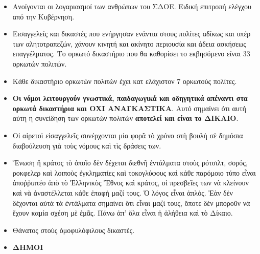 \documentclass[a4paper]{article}
\begin{document}
\begin{itemize}
\item Ανοίγονται οι λογαριασμοί των ανθρώπων του ΣΔΟΕ. Ειδική επιτροπή ελέγχου από την Κυβέρνηση.
\item Εισαγγελείς και δικαστές που ενήργησαν ενάντια στους πολίτες αδίκως και υπέρ των αλητοτραπεζών, χάνουν κινητή και ακίνητο περιουσία και άδεια ασκήσεως επαγγέλματος. Το ορκωτό δικαστήριο που θα καθορίσει το εκβησόμενο είναι 33 ορκωτών πολιτών.
\item Κάθε δικαστήριο ορκωτών πολιτών έχει κατ ελάχιστον 7 ορκωτούς πολίτες.
\item \textbf{Οι νόμοι λειτουργούν γνωστικά, παιδαγωγικά και οδηγητικά απέναντι στα ορκωτά δικαστήρια και ΟΧΙ ΑΝΑΓΚΑΣΤΙΚΑ}. Αυτό σημαίνει ότι αυτή αύτη η συνείδηση των ορκωτών πολιτών \textbf{αποτελεί και είναι το ΔΙΚΑΙΟ}.
\item Οἱ αἱρετοὶ εἰσαγγελεῖς συνέρχονται μία φορᾶ τὸ χρόνο στὴ βουλὴ σὲ δημόσια διαβούλευση γιὰ τοὺς νόμους καὶ τὶς δράσεις των.
\item Ἕνωση ἢ κράτος τὸ ὁποῖο δὲν δέχεται διεθνῆ ἐντάλματα στοὺς ρότσιλτ, σορός, ροκφελερ καὶ λοιποὺς ἐγκληματίες καὶ τοκογλύφους καὶ κάθε παρόμοιο τύπο εἶναι ἀποῤῥιπτέο ἀπὸ τὸ Ἑλληνικὸς Ἔθνος καὶ κράτος, οἱ πρεσβεῖες των νὰ κλείνουν καὶ νὰ ἀναστέλλεται κάθε ἐπαφὴ μαζί τους. Ὁ λόγος εἶναι ἁπλός. Ἐὰν δὲν δέχονται αὐτὰ τὰ ἐντάλματα σημαίνει ὅτι εἶναι μαζί τους, ὅποτε δὲν μποροῦν νὰ ἔχουν καμία σχέση μὲ ἐμᾶς. Πάνω ἀπ' ὅλα εἶναι ἡ ἀλήθεια καὶ τὸ Δίκαιο.
\item Θάνατος στοὺς ὁμοφυλόφιλους δικαστές.

\item  \textbf{ΔΗΜΟΙ}


\end{itemize}
\end{document}
